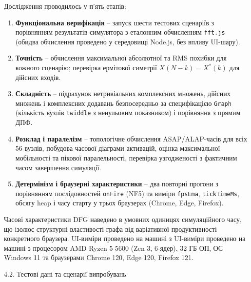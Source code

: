 \documentclass[
]{article}
\newcommand{\passthrough}[1]{#1}
\begin{document}
Дослідження проводилось у п'ять етапів:

\begin{enumerate}
\def\labelenumi{\arabic{enumi})}
\item
  \textbf{Функціональна верифікація} -- запуск шести тестових сценаріїв
  з порівнянням результатів симулятора з еталонним обчисленням
  \passthrough{\lstinline!fft.js!} (обидва обчислення проведено у
  середовищі Node.js, без впливу UI-шару).
\item
  \textbf{Точність} -- обчислення максимальної абсолютної та RMS похибки
  для кожного сценарію; перевірка ермітової симетрії
  \(X(N - k) = X^{*}(k)\) для дійсних входів.
\item
  \textbf{Складність} -- підрахунок нетривіальних комплексних множень,
  дійсних множень і комплексних додавань безпосередньо за специфікацією
  \passthrough{\lstinline!Graph!} (кількість вузлів
  \passthrough{\lstinline!twiddle!} з ненульовим показником) і
  порівняння з прямим ДПФ.
\item
  \textbf{Розклад і паралелізм} -- топологічне обчислення
  ASAP/ALAP-часів для всіх 56 вузлів, побудова часової діаграми
  активацій, оцінка максимальної мобільності та пікової паралельності,
  перевірка узгодженості з фактичним часом завершення симуляції.
\item
  \textbf{Детермінізм і браузерні характеристики} -- два повторні
  прогони з порівнянням послідовностей \passthrough{\lstinline!onFire!}
  (NF5) та виміри \passthrough{\lstinline!fpsEma!},
  \passthrough{\lstinline!tickTimeMs!}, обсягу heap і часу старту у
  трьох браузерах (Chrome, Edge, Firefox).
\end{enumerate}

Часові характеристики DFG наведено в умовних одиницях симуляційного
часу, що ізолює структурні властивості графа від варіативної
продуктивності конкретного браузера. UI-виміри проведено на машині з
UI-виміри проведено на машині з процесором AMD Ryzen 5 5600 (Zen 3,
6-ядер), 32 ГБ ОП, ОС Windows 11 та браузерами Chrome 120, Edge 120,
Firefox 121.

\protect{}\label{Xafea3fa084fe9e384714cab4626ef55af9419bd}{}4.2.
Тестові дані та сценарії випробувань
\end{document}
